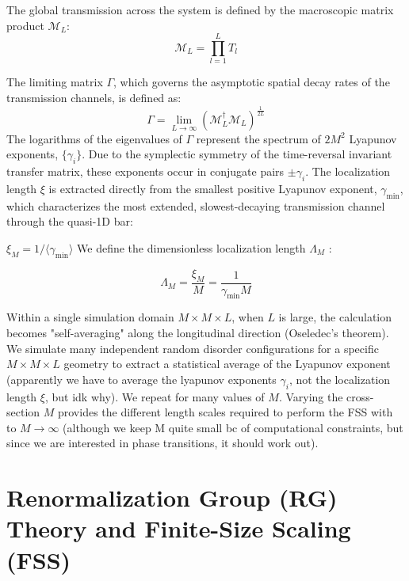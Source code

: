 \documentclass[11pt,a4paper]{article}
\begin{document}
The global transmission across the system is defined by the macroscopic matrix product $\mathcal{M}_L$:
\begin{equation}
\mathcal{M}_L = \prod_{l=1}^L T_l
\end{equation}

The limiting matrix $\Gamma$, which governs the asymptotic spatial decay rates of the transmission channels, is defined as:
\begin{equation}
\Gamma = \lim_{L \to \infty} \left( \mathcal{M}_L^\dagger \mathcal{M}_L \right)^{\frac{1}{2L}}
\end{equation}
The logarithms of the eigenvalues of $\Gamma$ represent the spectrum of $2M^2$ Lyapunov exponents, $\{\gamma_i\}$. Due to the symplectic symmetry of the time-reversal invariant transfer matrix, these exponents occur in conjugate pairs $\pm \gamma_i$. The localization length $\xi$ is extracted directly from the smallest positive Lyapunov exponent, $\gamma_{\text{min}}$, which characterizes the most extended, slowest-decaying transmission channel through the quasi-1D bar:

$\xi_M = 1/\langle \gamma_{\text{min}} \rangle$
We define the dimensionless localization length $\Lambda_M$ :

\begin{equation}
\Lambda_M = \frac{\xi_M}{M} = \frac{1}{\gamma_{\text{min}} M}
\end{equation}

Within a single simulation domain $M \times M \times L$, when $L$ is large, the calculation becomes "self-averaging" along the longitudinal direction (Oseledec's theorem). We simulate many independent random disorder configurations for a specific $M \times M \times L$ geometry to extract a statistical average of the Lyapunov exponent (apparently we have to average the lyapunov exponents $\gamma_i$, not the localization length $\xi$, but idk why).  We repeat for many values of $M$. Varying the cross-section $M$ provides the different length scales required to perform the FSS with to $M \to \infty$ (although we keep M quite small bc of computational constraints, but since we are interested in phase transitions, it should work out). 

\section{Renormalization Group (RG) Theory and Finite-Size Scaling (FSS)}
\end{document}
